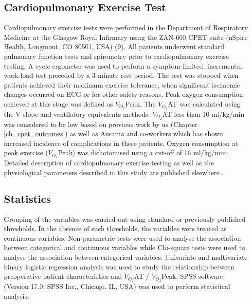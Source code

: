 \subsection{Cardiopulmonary Exercise Test}
Cardiopulmonary exercise tests were performed in the Department of Respiratory Medicine at the Glasgow Royal Infirmary using the ZAN-600 CPET suite (nSpire Health, Longmont, CO 80501, USA) (9). All patients underwent standard pulmonary function tests and spirometry prior to cardiopulmonary exercise testing. A cycle ergometer was used to perform a symptom-limited, incremental work-load test preceded by a 3-minute rest period. The test was stopped when patients achieved their maximum exercise tolerance, when significant ischaemic changes occurred on ECG or for other safety reasons. Peak oxygen consumption achieved at this stage was defined as $\dot{V}_{O_2}$Peak. The $\dot{V}_{O_2}$AT was calculated using the V-slope \parencite{beaver_new_1986,sue_metabolic_1988} and ventilatory equivalents \parencite{society_ats/accp_2003} methods. $\dot{V}_{O_2}$AT less than 10 ml/kg/min was considered to be low based on previous work by us (Chapter \ref{ch_cpet_outcomes}) as well as Ausania and co-workers \parencite{ausania_effects_2012} which has shown increased incidence of complications in these patients. Oxygen consumption at peak exercise ($\dot{V}_{O_2}$Peak) was dichotomised using a cut-off of 16 ml/kg/min. Detailed description of cardiopulmonary exercise testing as well as the physiological parameters described in this study are published elsewhere \parencite{balady_clinicians_2010}.

\subsection{Statistics}
Grouping of the variables was carried out using standard or previously published thresholds. In the absence of such thresholds, the variables were treated as continuous variables. Non-parametric tests were used to analyse the association between categorical and continuous variables while Chi-square tests were used to analyse the association between categorical variables. Univariate and multivariate binary logistic regression analysis was used to study the relationship between preoperative patient characteristics and $\dot{V}_{O_2}$AT / $\dot{V}_{O_2}$Peak. SPSS software (Version 17.0; SPSS Inc., Chicago, IL, USA) was used to perform statistical analysis.

\clearpage

